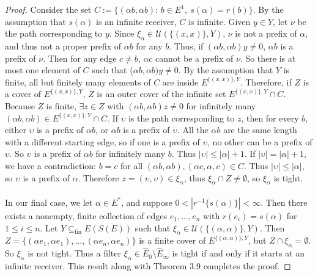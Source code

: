 \documentclass[12pt]{article}
\theoremstyle{definition}
\begin{document}
\begin{proof}
    Consider the set $C := \{ (\alpha b, \alpha b)\text{: } b \in E^1, \ s(\alpha) = r(b) \}$. By the assumption
    that $s(\alpha)$ is an infinite receiver, $C$ is infinite. Given $y \in Y$, let $\nu$ be the path corresponding to $y$.
    Since $\xi_\alpha \in \mathcal{U}(\{(x, x)\}, Y)$, $\nu$ is not a prefix of $\alpha$, and thus not a proper prefix of $\alpha b$ 
    for any $b$. Thus, if $(\alpha b, \alpha b)y \neq 0$, $\alpha b$ is a prefix of $\nu$. Then for any edge $c \neq b$, 
    $\alpha c$ cannot be a prefix of $\nu$. So there is at most one element of $C$ such that ($\alpha b, \alpha b)y \neq 0$.
    By the assumption that $Y$ is finite, all but finitely many elements of $C$ are inside $E^{\{(x, x)\}, Y}$. Therefore, if $Z$
    is a cover of $E^{\{(x, x)\}, Y}$, $Z$ is an outer cover of the infinite set $E^{\{(x, x)\}, Y} \cap C$. Because $Z$ is finite, $\exists z \in Z$ 
    with $(\alpha b, \alpha b)z \neq 0$ for infinitely many $(\alpha b, \alpha b) \in E^{\{(x, x)\}, Y} \cap C$. If $\upsilon$ is the path corresponding to $z$,
    then for every $b$, either $\upsilon$ is a prefix of $\alpha b$, or $\alpha b$ is a prefix of $\upsilon$.
    All the $\alpha b$ are the same length with a different starting edge, so if one is a prefix of $\upsilon$,
    no other can be a prefix of $\upsilon$. So $\upsilon$ is a prefix of $\alpha b$ for infinitely many $b$. Thus $|\upsilon| \leq |\alpha| + 1$.
    If $|\upsilon| = |\alpha| + 1$, we have a contradiction: $b = c$ for all $(\alpha b, \alpha b), (\alpha c, \alpha, c) \in C$.
    Thus $|\upsilon| \leq |\alpha|$, so $\upsilon$ is a prefix of $\alpha$. Therefore $z = (\upsilon, \upsilon) \in \xi_\alpha$, thus 
    $\xi_\alpha \cap Z \neq \emptyset$, so $\xi_\alpha$ is tight.
    \\ \\
    In our final case, we let $\alpha \in E^*$, and suppose $0 < |r^{-1}\{s(\alpha)\}| < \infty$. Then
    there exists a nonempty, finite collection of edges $e_1, ..., e_n$ with $r(e_i) = s(\alpha)$ for $1 \leq i \leq n$.
    Let $Y \subseteq_\text{fin} E(S(E))$ such that $\xi_\alpha \in \mathcal{U}(\{(\alpha, \alpha)\}, Y)$. 
    Then $Z = \{(\alpha e_1, \alpha e_1), ..., (\alpha e_n, \alpha e_n)\}$ is a finite cover of $E^{\{(\alpha, \alpha)\}, Y}$,
    but $Z \cap \xi_\alpha = \emptyset$. So $\xi_\alpha$ is not tight. Thus a filter $\xi_\alpha \in \hat{E}_0 \setminus \hat{E}_\infty$
    is tight if and only if it starts at an infinite receiver. This result along with Theorem 3.9 completes the proof.
\end{proof}
\end{document}
